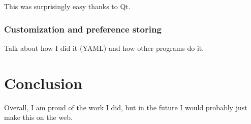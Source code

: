 \documentclass[11pt]{article}
\begin{document}
This was surprisingly easy thanks to Qt.

\subsubsection{Customization and preference storing}

Talk about how I did it (YAML) and how other programs do it.

\section{Conclusion}

Overall, I am proud of the work I did, but in the future I would probably just make this on the web.

\newpage
\nocite{*}


\end{document}
